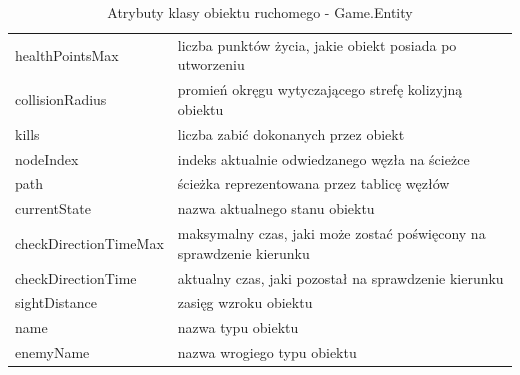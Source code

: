 \begin{table}[p]
\begin{center}
\begin{tabular}{|p{}|p{}|}
    healthPointsMax & liczba punktów życia, jakie obiekt posiada po utworzeniu\\
    collisionRadius & promień okręgu wytyczającego strefę kolizyjną obiektu\\
    kills & liczba zabić dokonanych przez obiekt\\
    nodeIndex & indeks aktualnie odwiedzanego węzła na ścieżce\\
    path & ścieżka reprezentowana przez tablicę węzłów\\
    currentState & nazwa aktualnego stanu obiektu\\
    checkDirectionTimeMax & maksymalny czas, jaki może zostać poświęcony na sprawdzenie kierunku\\
    checkDirectionTime & aktualny czas, jaki pozostał na sprawdzenie kierunku\\
    sightDistance & zasięg wzroku obiektu\\
    name & nazwa typu obiektu\\
    enemyName & nazwa wrogiego typu obiektu
\\\hline
\end{tabular}
\caption {Atrybuty klasy obiektu ruchomego - Game.Entity\label{objectsGameEntityAttrs}}
\end{center}
\end{table} 

